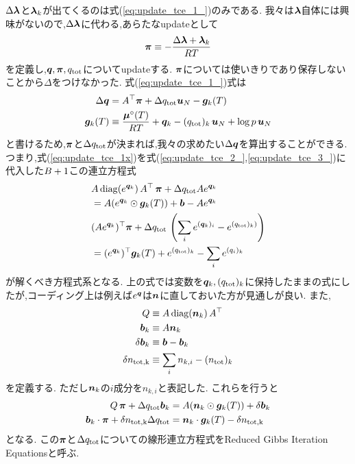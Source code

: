 $\Delta \boldsymbol{\lambda}$と$\boldsymbol{\lambda}_k$が出てくるのは式(\ref{eq:update_tce_1_})のみである. 我々は$\boldsymbol{\lambda}$自体には興味がないので,$\Delta \boldsymbol{\lambda}$に代わる,あらたなupdateとして
\begin{align}
    \boldsymbol{\pi} \equiv - \frac{\Delta \boldsymbol{\lambda} + \boldsymbol{\lambda}_k}{RT} 
\end{align}
を定義し,$\boldsymbol{q}, \boldsymbol{\pi}, q_\mathrm{tot}$についてupdateする. $\boldsymbol{\pi}$については使いきりであり保存しないことから$\Delta$をつけなかった. 式(\ref{eq:update_tce_1_})式は
\begin{align}
\label{eq:update_tce_1x}
    \Delta \boldsymbol{q} &=  A^\top \boldsymbol{\pi} + \Delta q_\mathrm{tot} \boldsymbol{u}_N - \boldsymbol{g}_k(T) \\
    \boldsymbol{g}_k (T) &\equiv \frac{\boldsymbol{\mu}^\circ(T)}{RT} + {\boldsymbol{q}}_k - (q_\mathrm{tot})_k \, \boldsymbol{u}_N + \log{p} \, \boldsymbol{u}_N 
\end{align}
と書けるため,$\boldsymbol{\pi}$と$\Delta q_\mathrm{tot}$が決まれば,我々の求めたい$\Delta \boldsymbol{q}$を算出することができる. つまり,式(\ref{eq:update_tce_1x})を式(\ref{eq:update_tce_2_},\ref{eq:update_tce_3_})に代入した$B+1$この連立方程式
\begin{align}
    &A \, \mathrm{diag} (e^{\boldsymbol{q}_k}) \, A^\top \, \boldsymbol{\pi} + \Delta q_\mathrm{tot} A e^{\boldsymbol{q}_k} \nonumber \\
    &= A (e^{\boldsymbol{q}_k} \odot \boldsymbol{g}_k (T) ) + \boldsymbol{b} - A  e^{\boldsymbol{q}_k} \\
    &(A  e^{\boldsymbol{q}_k})^\top \boldsymbol{\pi} + \Delta q_\mathrm{tot} \, \left( \sum_i e^{(\boldsymbol{q}_k)_i} - e^{(q_\mathrm{tot})_k)} \right) \nonumber \\ 
    &= (e^{\boldsymbol{q}_k})^\top \boldsymbol{g}_k(T) + e^{(q_\mathrm{tot})_k} - \sum_i {e^{(q_i)_k}} 
\end{align}
が解くべき方程式系となる. 上の式では変数を$\boldsymbol{q}_k, (q_\mathrm{tot})_k$に保持したままの式にしたが,コーディング上は例えば$e^{\boldsymbol{q}}$は$\boldsymbol{n}$に直しておいた方が見通しが良い. また,
\begin{align}
    Q &\equiv  A \, \mathrm{diag} (\boldsymbol{n}_k) \, A^\top \\
    \boldsymbol{b}_k &\equiv A \boldsymbol{n}_k \\
    \delta \boldsymbol{b}_k &\equiv \boldsymbol{b} - \boldsymbol{b}_k \\
     \delta n_\mathrm{tot,k} &\equiv  \sum_i n_{k,i} - (n_\mathrm{tot})_{k}
\end{align}
を定義する. ただし$\boldsymbol{n}_k$の$i$成分を$n_{k,i}$と表記した. これらを行うと
\begin{align}
\label{eq:rgie1}
   Q \, \boldsymbol{\pi} + \Delta q_\mathrm{tot} \boldsymbol{b}_k &= A ( \boldsymbol{n}_k \odot \boldsymbol{g}_k (T) ) + \delta \boldsymbol{b}_k \\
\label{eq:rgie2}
\boldsymbol{b}_k \cdot \boldsymbol{\pi} + \delta n_\mathrm{tot, k} \Delta q_\mathrm{tot} &= \boldsymbol{n}_k \cdot \boldsymbol{g}_k(T) - \delta n_\mathrm{tot,k}
\end{align}
となる. この$\boldsymbol{\pi}$と$\Delta q_\mathrm{tot}$についての線形連立方程式をReduced Gibbs Iteration Equationsと呼ぶ. 
